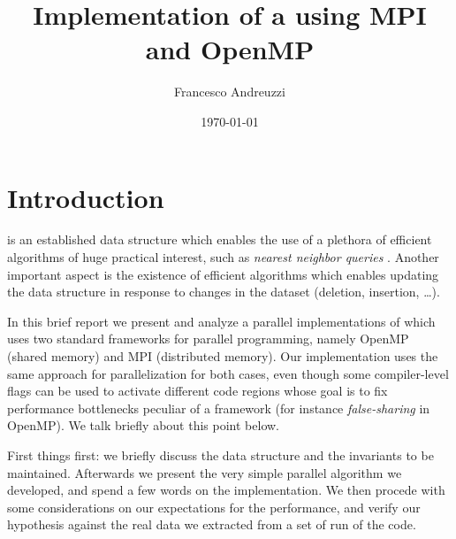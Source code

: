 \documentclass{article}
\title{Implementation of a \kdtree{} using MPI and OpenMP}
\author{Francesco Andreuzzi}
\date{\today}
\begin{document}
\maketitle



\section{Introduction} \label{sec:intro}
\kdtree{} is an established data structure which enables the use of a
plethora of efficient algorithms of huge practical interest, such as
\emph{nearest neighbor queries} \cite{bentley1975multidimensional}. Another
important aspect is the existence of efficient algorithms which enables updating
the data structure in response to changes in the dataset (deletion, insertion,
\dots).

In this brief report we present and analyze a parallel implementations of
\kdtree{} which uses two standard frameworks for parallel programming, namely
OpenMP \cite{dagum1998openmp} (shared memory) and MPI \cite{mpi} (distributed
memory). Our implementation uses the same approach for parallelization for
both cases, even though some compiler-level flags can be used to activate
different code regions whose goal is to fix performance bottlenecks peculiar of
a framework (for instance \emph{false-sharing} in OpenMP). We talk
briefly about this point below.

First things first: we briefly discuss the data structure and the invariants to
be maintained. Afterwards we present the very simple parallel algorithm we
developed, and spend a few words on the implementation. We then procede with
some considerations on our expectations for the performance, and verify our
hypothesis against the real data we extracted from a set of run of the code.
\end{document}
